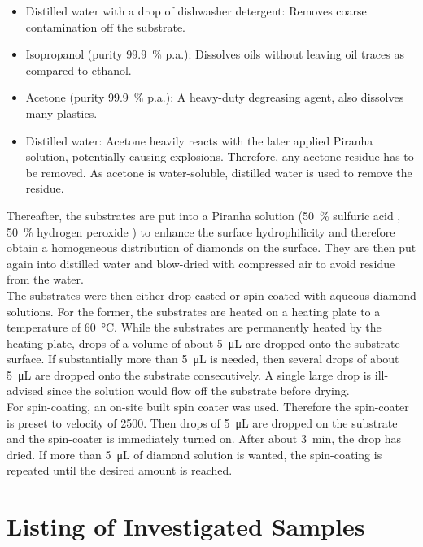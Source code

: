 		\begin{itemize}
			\item Distilled water with a drop of dishwasher detergent: Removes coarse contamination off the substrate.
			\item Isopropanol (purity \SI{99.9}{\percent} p.a.): Dissolves oils without leaving oil traces as compared to ethanol.
			\item Acetone (purity \SI{99.9}{\percent} p.a.): A heavy-duty degreasing agent, also dissolves many plastics.
			\item Distilled water: Acetone heavily reacts with the later applied Piranha solution, potentially causing explosions. Therefore, any acetone residue has to be removed. As acetone is water-soluble, distilled water is used to remove the residue.
		\end{itemize}

		Thereafter, the substrates are put into a Piranha solution (\SI{50}{\percent} sulfuric acid , \SI{50}{\percent} hydrogen peroxide ) to enhance the surface hydrophilicity and therefore obtain a homogeneous distribution of diamonds on the surface.
		They are then put again into distilled water and blow-dried with compressed air to avoid residue from the water.
		\\
		The substrates were then either drop-casted or spin-coated with aqueous diamond solutions.
		For the former, the substrates are heated on a heating plate to a temperature of \SI{60}{\celsius}.
		While the substrates are permanently heated by the heating plate, drops of a volume of about \SI{5}{\micro\liter} are dropped onto the substrate surface.
		If substantially more than \SI{5}{\micro\liter} is needed, then several drops of about \SI{5}{\micro\liter} are dropped onto the substrate consecutively. A single large drop is ill-advised since the solution would flow off the substrate before drying.
		\\
		For spin-coating, an on-site built spin coater was used.
		Therefore the spin-coater is preset to velocity of \SI{2500}{\rpm}.
		Then drops of \SI{5}{\micro\liter} are dropped on the substrate and the spin-coater is immediately turned on.
		After about \SI{3}{\minute}, the drop has dried.
		If more than \SI{5}{\micro\liter} of diamond solution is wanted, the spin-coating is repeated until the desired amount is reached.


	 \section[Samples List]{Listing of Investigated Samples}

